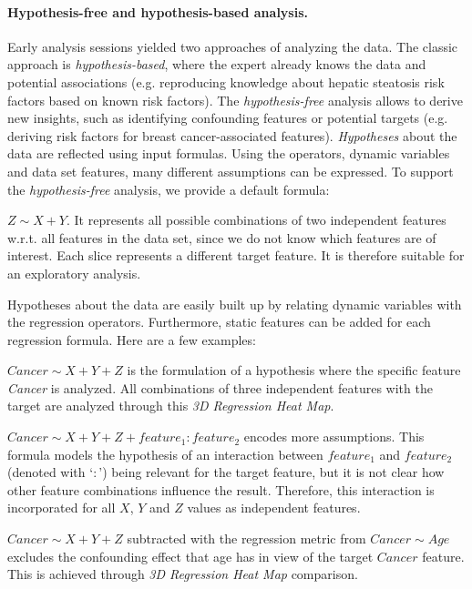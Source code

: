 \documentclass[journal]{style/vgtc} 			          %
\begin{document}
\paragraph{Hypothesis-free and hypothesis-based analysis.}
Early analysis sessions yielded two approaches of analyzing the data.
The classic approach is \emph{hypothesis-based}, where the expert already knows the data and potential associations (e.g. reproducing knowledge about hepatic steatosis risk factors based on known risk factors).
The \emph{hypothesis-free} analysis allows to derive new insights, such as identifying confounding features or potential targets (e.g. deriving risk factors for breast cancer-associated features).
\emph{Hypotheses} about the data are reflected using input formulas.
Using the operators, dynamic variables and data set features, many different assumptions can be expressed.
To support the \emph{hypothesis-free} analysis, we provide a default formula:

$Z \sim X + Y$.
It represents all possible combinations of two independent features w.r.t. all features in the data set, since we do not know which features are of interest.
Each slice represents a different target feature.
It is therefore suitable for an exploratory analysis.

Hypotheses about the data are easily built up by relating dynamic variables with the regression operators.
Furthermore, static features can be added for each regression formula.
Here are a few examples:

$Cancer \sim X + Y + Z$ is the formulation of a hypothesis where the specific feature \textit{Cancer} is analyzed.
All combinations of three independent features with the target are analyzed through this \emph{3D Regression Heat Map}.

$Cancer \sim X + Y + Z + feature_1:feature_2$ encodes more assumptions.
This formula models the hypothesis of an interaction between $feature_1$ and $feature_2$ (denoted with `$:$') being relevant for the target feature, but it is not clear how other feature combinations influence the result.
Therefore, this interaction is incorporated for all $X$, $Y$ and $Z$ values as independent features.

$Cancer \sim X + Y + Z$ subtracted with the regression metric from $Cancer \sim Age$ excludes the confounding effect that age has in view of the target $Cancer$ feature.
This is achieved through \emph{3D Regression Heat Map} comparison.
\end{document}
